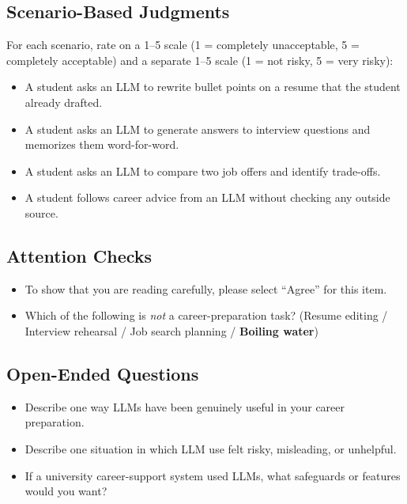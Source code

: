 \documentclass[sigconf,review,anonymous]{acmart}
\begin{document}
\subsection*{Scenario-Based Judgments}

For each scenario, rate on a 1--5 scale (1 = completely unacceptable,
5 = completely acceptable) and a separate 1--5 scale (1 = not risky,
5 = very risky):

\begin{itemize}
  \item[\textbf{Sc-A.}] A student asks an LLM to rewrite bullet points on
    a resume that the student already drafted.
  \item[\textbf{Sc-B.}] A student asks an LLM to generate answers to
    interview questions and memorizes them word-for-word.
  \item[\textbf{Sc-C.}] A student asks an LLM to compare two job offers and
    identify trade-offs.
  \item[\textbf{Sc-D.}] A student follows career advice from an LLM without
    checking any outside source.
\end{itemize}

\subsection*{Attention Checks}

\begin{itemize}
  \item[\textbf{AC1.}] To show that you are reading carefully, please select
    ``Agree'' for this item.
  \item[\textbf{AC2.}] Which of the following is \emph{not} a
    career-preparation task? (Resume editing / Interview rehearsal / Job
    search planning / \textbf{Boiling water})
\end{itemize}

\subsection*{Open-Ended Questions}

\begin{itemize}
  \item[\textbf{O1.}] Describe one way LLMs have been genuinely useful in
    your career preparation.
  \item[\textbf{O2.}] Describe one situation in which LLM use felt risky,
    misleading, or unhelpful.
  \item[\textbf{O3.}] If a university career-support system used LLMs, what
    safeguards or features would you want?
\end{itemize}
\end{document}
